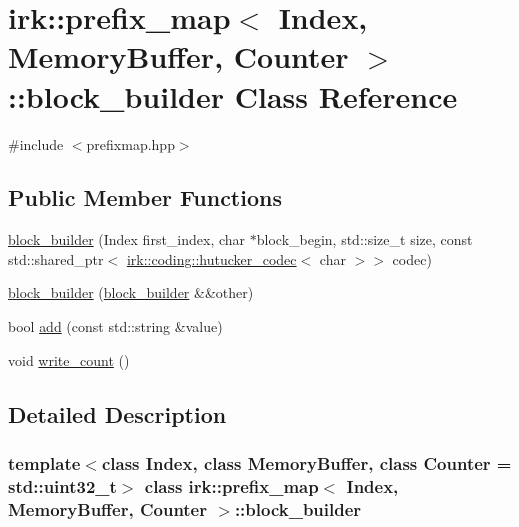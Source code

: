 \hypertarget{classirk_1_1prefix__map_1_1block__builder}{}\section{irk\+:\+:prefix\+\_\+map$<$ Index, Memory\+Buffer, Counter $>$\+:\+:block\+\_\+builder Class Reference}
\label{classirk_1_1prefix__map_1_1block__builder}


{\ttfamily \#include $<$prefixmap.\+hpp$>$}

\subsection*{Public Member Functions}
\begin{DoxyCompactItemize}
\item 
\mbox{\hyperlink{classirk_1_1prefix__map_1_1block__builder_ad2fe3431c27790ef67d21746064cdb6c}{block\+\_\+builder}} (Index first\+\_\+index, char $\ast$block\+\_\+begin, std\+::size\+\_\+t size, const std\+::shared\+\_\+ptr$<$ \mbox{\hyperlink{classirk_1_1coding_1_1hutucker__codec}{irk\+::coding\+::hutucker\+\_\+codec}}$<$ char $>$$>$ codec)
\item 
\mbox{\hyperlink{classirk_1_1prefix__map_1_1block__builder_a9c1475781fa1f5e3ed41aee76ab6adc0}{block\+\_\+builder}} (\mbox{\hyperlink{classirk_1_1prefix__map_1_1block__builder}{block\+\_\+builder}} \&\&other)
\item 
bool \mbox{\hyperlink{classirk_1_1prefix__map_1_1block__builder_a7624581bf15668f0be6733f8105d4c59}{add}} (const std\+::string \&value)
\item 
void \mbox{\hyperlink{classirk_1_1prefix__map_1_1block__builder_acd19257e8bac2d4af07431383c1c2c16}{write\+\_\+count}} ()
\end{DoxyCompactItemize}


\subsection{Detailed Description}
\subsubsection*{template$<$class Index, class Memory\+Buffer, class Counter = std\+::uint32\+\_\+t$>$\newline
class irk\+::prefix\+\_\+map$<$ Index, Memory\+Buffer, Counter $>$\+::block\+\_\+builder}

